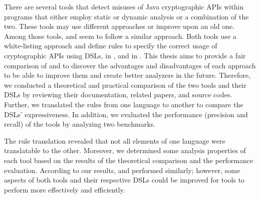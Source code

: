 There are several tools that detect misuses of Java cryptographic APIs within programs that either employ static or dynamic analysis or a combination of the two. These tools may use different approaches or improve upon an old one. Among those tools, \cognicryptsast{} and \codyze{} seem to follow a similar approach. Both tools use a white-listing approach and define rules to specify the correct usage of cryptographic APIs using DSLs, \crysl{} in \cognicryptsast, and \MARK{} in \codyze. This thesis aims to provide a fair comparison of \codyze{} and \cognicryptsast{} to discover the advantages and disadvantages of each approach to be able to improve them and create better analyzers in the future. Therefore, we conducted a theoretical and practical comparison of the two tools and their DSLs by reviewing their documentation, related papers, and source codes. Further, we translated the rules from one language to another to compare the DSLs' expressiveness. In addition, we evaluated the performance (precision and recall) of the tools by analyzing two benchmarks.

The rule translation revealed that not all elements of one language were translatable to the other. Moreover, we determined some analysis properties of each tool based on the results of the theoretical comparison and the performance evaluation. According to our results, \codyze{} and \cognicryptsast{} performed similarly; however, some aspects of both tools and their respective DSLs could be improved for tools to perform more effectively and efficiently.
